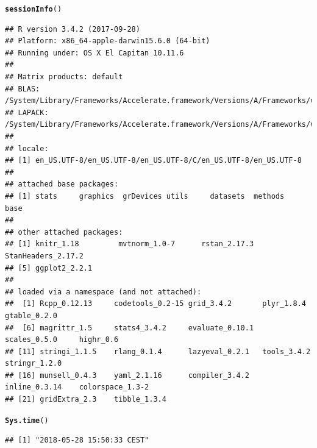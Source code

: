 \documentclass{article}\usepackage[]{graphicx}\usepackage[]{color}
\makeatletter
\newcommand{\hlstd}[1]{\textcolor[rgb]{0.345,0.345,0.345}{#1}}%
\newcommand{\hlkwd}[1]{\textcolor[rgb]{0.737,0.353,0.396}{\textbf{#1}}}%
\newenvironment{kframe}{%
 \def\at@end@of@kframe{}%
 \ifinner\ifhmode%
  \def\at@end@of@kframe{\end{minipage}}%
  \begin{minipage}{\columnwidth}%
 \fi\fi%
 \def\FrameCommand##1{\hskip\@totalleftmargin \hskip-\fboxsep
 \colorbox{shadecolor}{##1}\hskip-\fboxsep
     \hskip-\linewidth \hskip-\@totalleftmargin \hskip\columnwidth}%
 \MakeFramed {\advance\hsize-\width
   \@totalleftmargin\z@ \linewidth\hsize
   \@setminipage}}%
 {\par\unskip\endMakeFramed%
 \at@end@of@kframe}
\newenvironment{knitrout}{}{} %
\makeatother
\begin{document}
\begin{knitrout}
\color{fgcolor}\begin{kframe}
\begin{alltt}
\hlkwd{sessionInfo}\hlstd{()}
\end{alltt}
\begin{verbatim}
## R version 3.4.2 (2017-09-28)
## Platform: x86_64-apple-darwin15.6.0 (64-bit)
## Running under: OS X El Capitan 10.11.6
## 
## Matrix products: default
## BLAS: /System/Library/Frameworks/Accelerate.framework/Versions/A/Frameworks/vecLib.framework/Versions/A/libBLAS.dylib
## LAPACK: /System/Library/Frameworks/Accelerate.framework/Versions/A/Frameworks/vecLib.framework/Versions/A/libLAPACK.dylib
## 
## locale:
## [1] en_US.UTF-8/en_US.UTF-8/en_US.UTF-8/C/en_US.UTF-8/en_US.UTF-8
## 
## attached base packages:
## [1] stats     graphics  grDevices utils     datasets  methods   base     
## 
## other attached packages:
## [1] knitr_1.18         mvtnorm_1.0-7      rstan_2.17.3       StanHeaders_2.17.2
## [5] ggplot2_2.2.1     
## 
## loaded via a namespace (and not attached):
##  [1] Rcpp_0.12.13     codetools_0.2-15 grid_3.4.2       plyr_1.8.4       gtable_0.2.0    
##  [6] magrittr_1.5     stats4_3.4.2     evaluate_0.10.1  scales_0.5.0     highr_0.6       
## [11] stringi_1.1.5    rlang_0.1.4      lazyeval_0.2.1   tools_3.4.2      stringr_1.2.0   
## [16] munsell_0.4.3    yaml_2.1.16      compiler_3.4.2   inline_0.3.14    colorspace_1.3-2
## [21] gridExtra_2.3    tibble_1.3.4
\end{verbatim}
\begin{alltt}
\hlkwd{Sys.time}\hlstd{()}
\end{alltt}
\begin{verbatim}
## [1] "2018-05-28 15:50:33 CEST"
\end{verbatim}
\end{kframe}
\end{knitrout}
\end{document}
